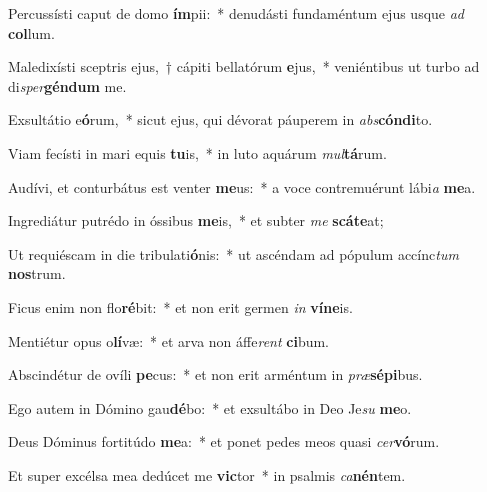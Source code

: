 \item Percussísti caput de domo \textbf{ím}pii:~* denudásti fundaméntum ejus usque \textit{ad} \textbf{col}lum.
\item Maledixísti sceptris ejus,~† cápiti bellatórum \textbf{e}jus,~* veniéntibus ut turbo ad di\textit{sper}\textbf{gén}\textbf{dum} me.
\item Exsultátio e\textbf{ó}rum,~* sicut ejus, qui dévorat páuperem in \textit{abs}\textbf{cón}\textbf{di}to.
\item Viam fecísti in mari equis \textbf{tu}is,~* in luto aquárum \textit{mul}\textbf{tá}rum.
\item Audívi, et conturbátus est venter \textbf{me}us:~* a voce contremuérunt lábi\textit{a} \textbf{me}a.
\item Ingrediátur putrédo in óssibus \textbf{me}is,~* et subter \textit{me} \textbf{scá}\textbf{te}at;
\item Ut requiéscam in die tribulati\textbf{ó}nis:~* ut ascéndam ad pópulum accínc\textit{tum} \textbf{nos}trum.
\item Ficus enim non flo\textbf{ré}bit:~* et non erit germen \textit{in} \textbf{ví}\textbf{ne}is.
\item Mentiétur opus o\textbf{lí}væ:~* et arva non áffe\textit{rent} \textbf{ci}bum.
\item Abscindétur de ovíli \textbf{pe}cus:~* et non erit arméntum in \textit{præ}\textbf{sé}\textbf{pi}bus.
\item Ego autem in Dómino gau\textbf{dé}bo:~* et exsultábo in Deo Je\textit{su} \textbf{me}o.
\item Deus Dóminus fortitúdo \textbf{me}a:~* et ponet pedes meos quasi \textit{cer}\textbf{vó}rum.
\item Et super excélsa mea dedúcet me \textbf{vic}tor~* in psalmis \textit{ca}\textbf{nén}tem.
